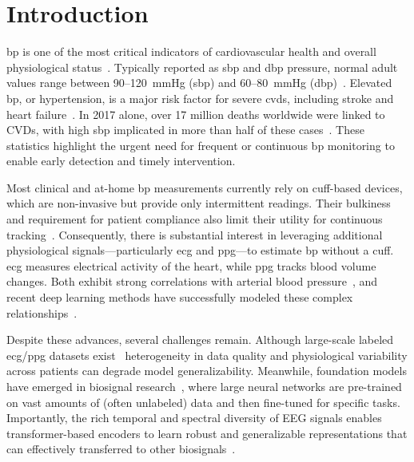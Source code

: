 \section{Introduction}
\Gls{bp} is one of the most critical indicators of cardiovascular health and overall physiological status~\cite{vital_signs}. Typically reported as \gls{sbp} and \gls{dbp} pressure, normal adult values range between 90–120~mmHg (\gls{sbp}) and 60–80~mmHg (\gls{dbp})~\cite{bp_range}. Elevated \gls{bp}, or hypertension, is a major risk factor for severe \glspl{cvd}, including stroke and heart failure~\cite{leading_cause,CVDs_num}. In 2017 alone, over 17 million deaths worldwide were linked to CVDs, with high \gls{sbp} implicated in more than half of these cases~\cite{HSBP_num}. These statistics highlight the urgent need for frequent or continuous \gls{bp} monitoring to enable early detection and timely intervention.

Most clinical and at-home \gls{bp} measurements currently rely on cuff-based devices, which are non-invasive but provide only intermittent readings. Their bulkiness and requirement for patient compliance also limit their utility for continuous tracking~\cite{bradley2022cuffless, pilz2024cuff}. Consequently, there is substantial interest in leveraging additional physiological signals—particularly \gls{ecg} and \gls{ppg}—to estimate \gls{bp} without a cuff. \gls{ecg} measures electrical activity of the heart, while \gls{ppg} tracks blood volume changes. Both exhibit strong correlations with arterial blood pressure~\cite{ECG_BOOK,ppg_book}, and recent deep learning methods have successfully modeled these complex relationships~\cite{Faust2018DeepLF,Jamil}.

Despite these advances, several challenges remain. Although large-scale labeled \gls{ecg}/\gls{ppg} datasets exist~\cite{ptb-xl,mimiciii,vitaldb} heterogeneity in data quality and physiological variability across patients can degrade model generalizability. Meanwhile, foundation models have emerged in biosignal research~\cite{CEReBrO,Mehta2023CantTT}, where large neural networks are pre-trained on vast amounts of (often unlabeled) data and then fine-tuned for specific tasks. Importantly, the rich temporal and spectral diversity of EEG signals enables transformer-based encoders to learn robust and generalizable representations that can effectively transferred to other biosignals~\cite{yang2023cross,joshi2021deep}.

